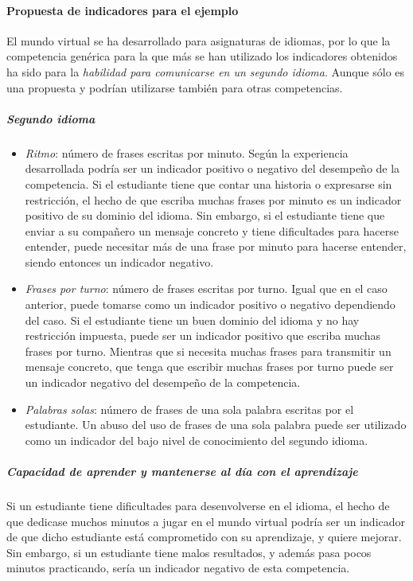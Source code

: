 			\paragraph*{Propuesta de indicadores para el ejemplo}

			El mundo virtual se ha desarrollado para asignaturas de idiomas, por lo que la competencia genérica para la que más se han utilizado los indicadores obtenidos ha sido para la \emph{habilidad para comunicarse en un segundo idioma}. Aunque sólo es una propuesta y podrían utilizarse también para otras competencias.


			\subparagraph*{Segundo idioma}
\begin{itemize}
\item \emph{Ritmo}: número de frases escritas por minuto. Según la experiencia desarrollada podría ser un indicador positivo o negativo del desempeño de la competencia. Si el estudiante tiene que contar una historia o expresarse sin restricción, el hecho de que escriba muchas frases por minuto es un indicador positivo de su dominio del idioma. Sin embargo, si el estudiante tiene que enviar a su compañero un mensaje concreto y tiene dificultades  para hacerse entender, puede necesitar más de una frase por minuto para hacerse entender, siendo entonces un indicador negativo.
\item \emph{Frases por turno}: número de frases escritas por turno. Igual que en el caso anterior, puede tomarse como un indicador positivo o negativo dependiendo del caso. Si el estudiante tiene un buen dominio del idioma y no hay restricción impuesta, puede ser un indicador positivo que escriba muchas frases por turno. Mientras que si necesita muchas frases para transmitir un mensaje concreto, que tenga que escribir muchas frases por turno puede ser un indicador negativo del desempeño de la competencia.
\item \emph{Palabras solas}: número de frases de una sola palabra escritas por el estudiante. Un abuso del uso de frases de una sola palabra puede ser utilizado como un indicador del bajo nivel de conocimiento del segundo idioma.
\end{itemize}

			\subparagraph*{Capacidad de aprender y mantenerse al día con el aprendizaje}
			Si un estudiante tiene dificultades para desenvolverse en el idioma, el hecho de que dedicase muchos minutos a jugar en el mundo virtual podría ser un indicador de que dicho estudiante está comprometido con su aprendizaje, y quiere mejorar. Sin embargo, si un estudiante tiene malos resultados, y además pasa pocos minutos practicando, sería un indicador negativo de esta competencia.

